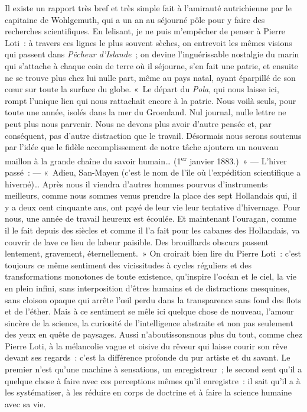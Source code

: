 \documentclass[french,twoside]{book} %
\begin{document}
Il existe un rapport très bref et très simple fait à l’amirauté autrichienne par le capitaine de Wohlgemuth, qui a un an au séjourné pôle pour y faire des recherches scientifiques. En lelisant, je ne puis m’empêcher de penser à Pierre Loti : à travers ces lignes le plus souvent sèches, on entrevoit les mêmes visions qui passent dans \emph{Pêcheur d’Islande} ; on devine l’inguérissable nostalgie du marin qui s’attache à chaque coin de terre où il séjourne, s’en fait une patrie, et ensuite ne se trouve plus chez lui nulle part, même au pays natal, ayant éparpillé de son cœur sur toute la surface du globe. « Le départ du \emph{Pola}, qui nous laisse ici, rompt l’unique lien qui nous rattachait encore à la patrie. Nous voilà seuls, pour toute une année, isolés dans la mer du Groenland. Nul journal, nulle lettre ne peut plus nous parvenir. Nous ne devons plus avoir d’autre pensée et, par conséquent, pas d’autre distraction que le travail. Désormais nous serons soutenus par l’idée que le fidèle accomplissement de notre tâche ajoutera un nouveau maillon à la grande chaîne du savoir humain… (1\textsuperscript{er} janvier 1883.) » — L’hiver passé : — « Adieu, San-Mayen (c’est le nom de l’île où l’expédition scientifique a hiverné)… Après nous il viendra d’autres hommes pourvus d’instruments meilleurs, comme nous sommes venus prendre la place des sept Hollandais qui, il y a deux cent cinquante ans, ont payé de leur vie leur tentative d’hivernage. Pour nous, une année de travail heureux est écoulée. Et maintenant l’ouragan, comme il le fait depuis des siècles et comme il l’a fait pour les cabanes des Hollandais, va couvrir de lave ce lieu de labeur paisible. Des brouillards obscurs passent lentement, gravement, éternellement. » On croirait bien lire du Pierre Loti : c’est toujours ce même sentiment des vicissitudes à cycles réguliers et des transformations monotones de toute existence, qu’inspire l’océan et le ciel, la vie en plein infini, sans interposition d’êtres humains et de distractions mesquines, sans cloison opaque qui arrête l’œil perdu dans la transparence sans fond des flots et de l’éther. Mais à ce sentiment se mêle ici quelque chose de nouveau, l’amour sincère de la science, la curiosité de l’intelligence abstraite et non pas seulement des yeux en quête de paysages. Aussi n’aboutissonsnous plus du tout, comme chez Pierre Loti, à la mélancolie vague et oisive du rêveur qui laisse courir son rêve devant ses regards : c’est la différence profonde du pur artiste et du savant. Le premier n’est qu’une machine à sensations, un enregistreur ; le second sent qu’il a quelque chose à faire avec ces perceptions mêmes qu’il enregistre : il sait qu’il a à les systématiser, à les réduire en corps de doctrine et à faire la science humaine avec sa vie.\par
\end{document}
